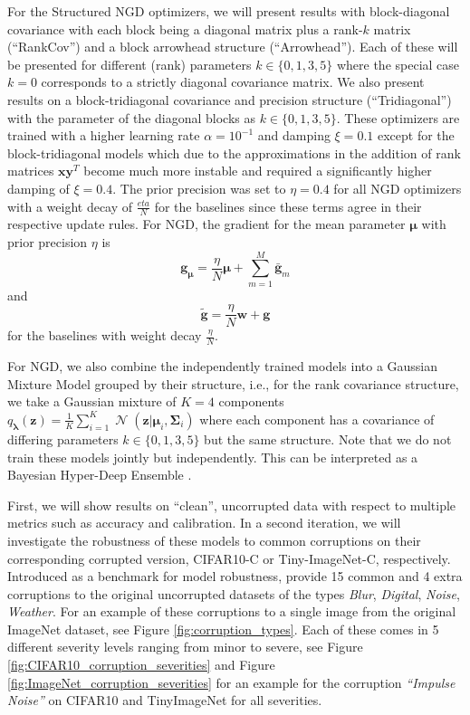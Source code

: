 \documentclass[a4paper, 11pt, oneside]{scrartcl}
\theoremstyle{break}
\DeclareMathOperator{\Normal}{\mathcal{N}}
\newcommand{\matr}[1]{\boldsymbol{#1}}
\numberwithin{equation}{section}
\begin{document}
		For the Structured NGD optimizers, we will present results with block-diagonal covariance with each block being a diagonal matrix plus a rank-$k$ matrix (``RankCov'') and a block arrowhead structure (``Arrowhead'').
		Each of these will be presented for different (rank) parameters $k \in \{0, 1, 3, 5\}$ where the special case $k = 0$ corresponds to a strictly diagonal covariance matrix. 
		We also present results on a block-tridiagonal covariance and precision structure (``Tridiagonal'') with the parameter of the diagonal blocks as $k \in \{0, 1, 3, 5\}$.
		These optimizers are trained with a higher learning rate $\alpha = 10^{-1}$ and damping $\xi = 0.1$ except for the block-tridiagonal models which due to the approximations in the addition of rank matrices $\matr{x} \matr{y}^T$ become much more instable and required a significantly higher damping of $\xi = 0.4$.
		The prior precision was set to $\eta = 0.4$ for all NGD optimizers with a weight decay of $\frac{eta}{N}$ for the baselines since these terms agree in their respective update rules.
		For NGD, the gradient for the mean parameter $\matr{\mu}$ with prior precision $\eta$ is 
		\[
			\matr{g}_{\matr{\mu}} = \frac{\eta}{N} \matr{\mu} + \sum_{m=1}^M \matr{\bar{g}}_m
		\]
		and 
		\[
			\matr{\tilde{g}} = \frac{\eta}{N} \matr{w} + \matr{g}
		\]
		for the baselines with weight decay $\frac{\eta}{N}$.

		For NGD, we also combine the independently trained models into a Gaussian Mixture Model grouped by their structure, i.e., for the rank covariance structure, we take a Gaussian mixture of $K = 4$ components $q_{\matr{\lambda}} (\matr{z}) = \frac{1}{K} \sum_{i=1}^K \Normal(\matr{z} | \matr{\mu}_i, \matr{\Sigma}_i)$ where each component has a covariance of differing parameters $k \in \{0, 1, 3, 5\}$ but the same structure.
		Note that we do not train these models jointly but independently.
		This can be interpreted as a Bayesian Hyper-Deep Ensemble \parencite{WST+20}.

		First, we will show results on ``clean'', uncorrupted data with respect to multiple metrics such as accuracy and calibration. 
		In a second iteration, we will investigate the robustness of these models to common corruptions on their corresponding corrupted version, CIFAR10-C or Tiny-ImageNet-C, respectively. 
		Introduced as a benchmark for model robustness, \parencite{HD19} provide 15 common and 4 extra corruptions to the original uncorrupted datasets of the types \emph{Blur}, \emph{Digital}, \emph{Noise}, \emph{Weather}.
		For an example of these corruptions to a single image from the original ImageNet dataset, see Figure \ref{fig:corruption_types}.
		Each of these comes in 5 different severity levels ranging from minor to severe, see Figure \ref{fig:CIFAR10_corruption_severities} and Figure \ref{fig:ImageNet_corruption_severities} for an example for the corruption \emph{``Impulse Noise''} on CIFAR10 and TinyImageNet for all severities.
\end{document}
